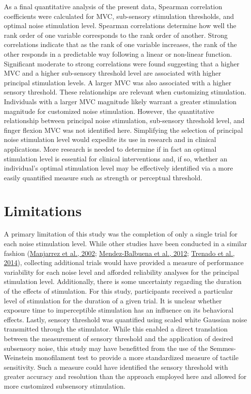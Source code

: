 \documentclass[]{cik}%
\begin{document}
As a final quantitative analysis of the present data, Spearman
correlation coefficients were calculated for MVC, sub-sensory
stimulation thresholds, and optimal noise stimulation level. Spearman
correlations determine how well the rank order of one variable
corresponds to the rank order of another. Strong correlations indicate
that as the rank of one variable increases, the rank of the other
responds in a predictable way following a linear or non-linear function.
Significant moderate to strong correlations were found suggesting that a
higher MVC and a higher sub-sensory threshold level are associated with
higher principal stimulation levels. A larger MVC was also associated
with a higher sensory threshold. These relationships are relevant when
customizing stimulation. Individuals with a larger MVC magnitude likely
warrant a greater stimulation magnitude for customized noise
stimulation. However, the quantitative relationship between principal
noise stimulation, sub-sensory threshold level, and finger flexion MVC
was not identified here. Simplifying the selection of principal noise
stimulation level would expedite its use in research and in clinical
applications. More research is needed to determine if in fact an optimal
stimulation level is essential for clinical interventions and, if so,
whether an individual's optimal stimulation level may be effectively
identified via a more easily quantified measure such as strength or
perceptual threshold.

\hypertarget{limitations}{%
\section{Limitations}\label{limitations}}

A primary limitation of this study was the completion of only a single
trial for each noise stimulation level. While other studies have been
conducted in a similar fashion
(\protect\hyperlink{ref-Manjarrez2002}{Manjarrez et al., 2002};
\protect\hyperlink{ref-Mendez-Balbuena2012}{Mendez-Balbuena et al.,
2012}; \protect\hyperlink{ref-Trenado2014}{Trenado et al., 2014}),
collecting additional trials would have provided a measure of
performance variability for each noise level and afforded reliability
analyses for the principal stimulation level. Additionally, there is
some uncertainty regarding the duration of the effects of stimulation.
For this study, participants received a particular level of stimulation
for the duration of a given trial. It is unclear whether exposure time
to imperceptible stimulation has an influence on its behavioral effects.
Lastly, sensory threshold was quantified using scaled white Gaussian
noise transmitted through the stimulator. While this enabled a direct
translation between the measurement of sensory threshold and the
application of desired subsensory noise, this study may have benefitted
from the use of the Semmes-Weinstein monofilament test to provide a more
standardized measure of tactile sensitivity. Such a measure could have
identified the sensory threshold with greater accuracy and resolution
than the approach employed here and allowed for more customized
subsensory stimulation.
\end{document}
